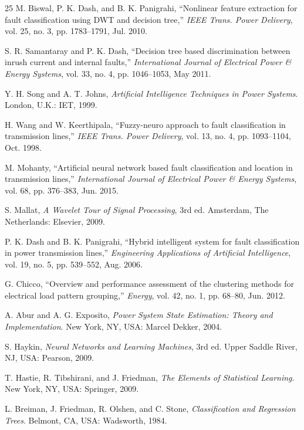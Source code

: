 \documentclass[journal]{IEEEtran}
\begin{document}
\begin{thebibliography}{25}
M. Biswal, P. K. Dash, and B. K. Panigrahi, ``Nonlinear feature extraction for fault classification using DWT and decision tree,'' \emph{IEEE Trans. Power Delivery}, vol. 25, no. 3, pp. 1783--1791, Jul. 2010.

S. R. Samantaray and P. K. Dash, ``Decision tree based discrimination between inrush current and internal faults,'' \emph{International Journal of Electrical Power \& Energy Systems}, vol. 33, no. 4, pp. 1046--1053, May 2011.

Y. H. Song and A. T. Johns, \emph{Artificial Intelligence Techniques in Power Systems}. London, U.K.: IET, 1999.

H. Wang and W. Keerthipala, ``Fuzzy-neuro approach to fault classification in transmission lines,'' \emph{IEEE Trans. Power Delivery}, vol. 13, no. 4, pp. 1093--1104, Oct. 1998.

M. Mohanty, ``Artificial neural network based fault classification and location in transmission lines,'' \emph{International Journal of Electrical Power \& Energy Systems}, vol. 68, pp. 376--383, Jun. 2015.

S. Mallat, \emph{A Wavelet Tour of Signal Processing}, 3rd ed. Amsterdam, The Netherlands: Elsevier, 2009.

P. K. Dash and B. K. Panigrahi, ``Hybrid intelligent system for fault classification in power transmission lines,'' \emph{Engineering Applications of Artificial Intelligence}, vol. 19, no. 5, pp. 539--552, Aug. 2006.

G. Chicco, ``Overview and performance assessment of the clustering methods for electrical load pattern grouping,'' \emph{Energy}, vol. 42, no. 1, pp. 68--80, Jun. 2012.

A. Abur and A. G. Exposito, \emph{Power System State Estimation: Theory and Implementation}. New York, NY, USA: Marcel Dekker, 2004.

S. Haykin, \emph{Neural Networks and Learning Machines}, 3rd ed. Upper Saddle River, NJ, USA: Pearson, 2009.

T. Hastie, R. Tibshirani, and J. Friedman, \emph{The Elements of Statistical Learning}. New York, NY, USA: Springer, 2009.

L. Breiman, J. Friedman, R. Olshen, and C. Stone, \emph{Classification and Regression Trees}. Belmont, CA, USA: Wadsworth, 1984.


\end{thebibliography}
\end{document}
